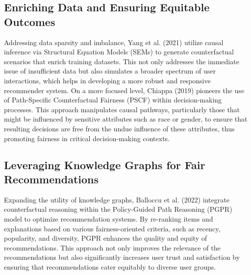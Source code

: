 \subsection{Enriching Data and Ensuring Equitable Outcomes}

Addressing data sparsity and imbalance, Yang et al. (2021) utilize causal inference via Structural Equation Models (SEMs) to generate counterfactual scenarios that enrich training datasets. This not only addresses the immediate issue of insufficient data but also simulates a broader spectrum of user interactions, which helps in developing a more robust and responsive recommender system. On a more focused level, Chiappa (2019) pioneers the use of Path-Specific Counterfactual Fairness (PSCF) within decision-making processes. This approach manipulates causal pathways, particularly those that might be influenced by sensitive attributes such as race or gender, to ensure that resulting decisions are free from the undue influence of these attributes, thus promoting fairness in critical decision-making contexts.

\subsection{Leveraging Knowledge Graphs for Fair Recommendations}

Expanding the utility of knowledge graphs, Balloccu et al. (2022) integrate counterfactual reasoning within the Policy-Guided Path Reasoning (PGPR) model to optimize recommendation systems. By re-ranking items and explanations based on various fairness-oriented criteria, such as recency, popularity, and diversity, PGPR enhances the quality and equity of recommendations. This approach not only improves the relevance of the recommendations but also significantly increases user trust and satisfaction by ensuring that recommendations cater equitably to diverse user groups.



